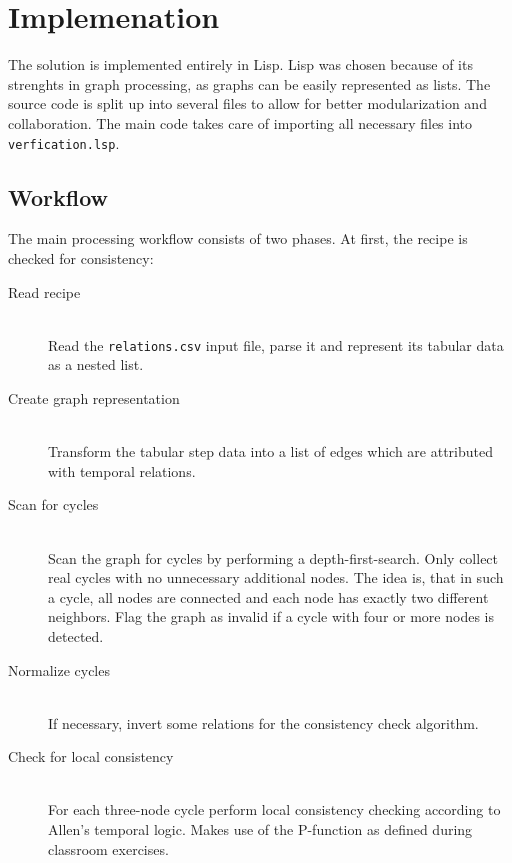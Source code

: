 \chapter{Implemenation}
\label{sec:impl}

    The solution is implemented entirely in Lisp. Lisp was chosen because of its
    strenghts in graph processing, as graphs can be easily represented as lists.
    The source code is split up into several files to allow for better
    modularization and collaboration. The main code takes care of importing all
    necessary files into \texttt{verfication.lsp}.
    
    \section{Workflow}
    
        The main processing workflow consists of two phases. At first, the
        recipe is checked for consistency:
        
        \begin{description}
            \item[Read recipe] \hfill \\
                Read the \texttt{relations.csv} input file, parse it and
                represent its tabular data as a nested list.
            \item[Create graph representation] \hfill \\
                Transform the tabular step data into a list of edges which are
                attributed with temporal relations.
            \item[Scan for cycles] \hfill \\
                Scan the graph for cycles by performing a depth-first-search.
                Only collect real cycles with no unnecessary additional nodes.
                The idea is, that in such a cycle, all nodes are connected and
                each node has exactly two different neighbors. Flag the graph as
                invalid if a cycle with four or more nodes is detected.
            \item[Normalize cycles] \hfill \\
                If necessary, invert some relations for the consistency check
                algorithm.
            \item[Check for local consistency] \hfill \\
                For each three-node cycle perform local consistency checking
                according to Allen's temporal logic. Makes use of the P-function
                as defined during classroom exercises.
        \end{description}
        
